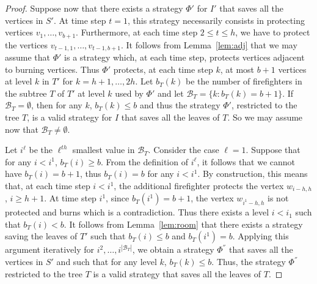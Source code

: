 \documentclass[10pt]{article}
\begin{document}
\begin{proof}
\medskip
Suppose now that there exists a strategy $\Phi'$ for $I'$ that
saves all the vertices in $S'$. At time step $t=1$, this strategy necessarily consists in protecting vertices $v_1,\ldots,v_{b+1}$. Furthermore, at each time step $2\leq t\leq h$, we have to protect the vertices $v_{t-1,1},\ldots,v_{t-1,b+1}$. It follows from Lemma~\ref{lem:adj} that we may assume that $\Phi'$
is a strategy which, at each time step, protects vertices adjacent to burning vertices.
Thus $\Phi'$ protects, at each time step $k$, at most $b+1$ vertices at level $k$ in $T'$
for $k=h+1,\ldots,2h$.
Let $b_{T}(k)$ be the number of firefighters in the subtree $T$ of $T'$ at level $k$ used by $\Phi'$ and let $\mathcal{B}_{T} = \{k:b_{T}(k) = b+1\}$.
If $\mathcal{B}_{T} = \emptyset$, then for any $k$, $b_{T}(k) \leq b$ and thus the strategy $\Phi'$, restricted to the tree $T$, is a valid strategy for $I$ that saves
all the leaves of $T$. So we may assume now that $\mathcal{B}_{T} \neq \emptyset$.


Let $i^{\ell}$ be the $\ell^{th}$ smallest value in $\mathcal{B}_{T}$.
Consider the case $\ell=1$. Suppose that for any $i < i^{1}$,
$b_{T}(i) \geq b$. From the definition of $i^{\ell}$, it follows that we cannot
have $b_{T}(i) = b+1$, thus $b_{T}(i) = b$ for any $ i < i^{1}$. By
construction, this means that, at each time step $i < i^{1}$, the
additional firefighter protects the vertex $w_{i-h,h}$, $i\geq h+1$.
At time step $i^{1}$, since $b_{T}(i^{1}) = b+1$, the vertex
$w_{i^{1}-h,h}$ is not protected and burns which is a contradiction. Thus
there exists a level $i <i_1$ such that $b_{T}(i) < b$.
It follows from Lemma~\ref{lem:room} that there exists a strategy saving the leaves of $T'$
such that $b_{T}(i) \leq b$ and $b_{T}(i^{1}) = b$. Applying this argument
iteratively for $i^{2},\ldots, i^{|\mathcal{B}_{T}|}$, we obtain a strategy $\Phi^{''}$ that saves all the
vertices in $S'$ and such that for any level $k$, $b_{T}(k)
\leq b$. Thus, the strategy $\Phi^{''}$ restricted to the tree
$T$ is a valid strategy that saves all the leaves of $T$.
\end{proof}
\end{document}
